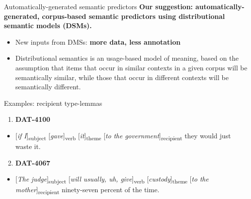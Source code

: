 \documentclass[
  ignorenonframetext,
]{beamer}
\providecommand{\tightlist}{%
  \setlength{\itemsep}{0pt}\setlength{\parskip}{0pt}}\usepackage{longtable,booktabs,array}
\begin{document}
\begin{frame}{Automatically-generated semantic predictors}
\protect\hypertarget{automatically-generated-semantic-predictors}{}
\textbf{Our suggestion: automatically-generated, corpus-based semantic
predictors using distributional semantic models (DSMs).}

\begin{itemize}
\item
  New inputs from DMSs: \textbf{more data, less annotation}
\item
  Distributional semantics is an usage-based model of meaning, based on
  the assumption that items that occur in similar contexts in a given
  corpus will be semantically similar, while those that occur in
  different contexts will be semantically different.
\end{itemize}

\end{frame}

\begin{frame}{Examples: recipient type-lemmas}
\protect\hypertarget{examples-recipient-type-lemmas}{}
\begin{enumerate}
\tightlist
\item
  \textbf{DAT-4100}
\end{enumerate}

\begin{itemize}
\tightlist
\item
  {[}\emph{if I}{]}\textsubscript{subject}
  {[}\emph{gave}{]}\textsubscript{verb}
  {[}\emph{it}{]}\textsubscript{theme} {[}\emph{to the
  government}{]}\textsubscript{recipient} they would just waste it.
\end{itemize}

\begin{enumerate}
\setcounter{enumi}{1}
\tightlist
\item
  \textbf{DAT-4067}
\end{enumerate}

\begin{itemize}
\tightlist
\item
  {[}\emph{The judge}{]}\textsubscript{subject} {[}\emph{will usually,
  uh, give}{]}\textsubscript{verb}
  {[}\emph{custody}{]}\textsubscript{theme} {[}\emph{to the
  mother}{]}\textsubscript{recipient} ninety-seven percent of the time.
\end{itemize}

\end{frame}
\end{document}
